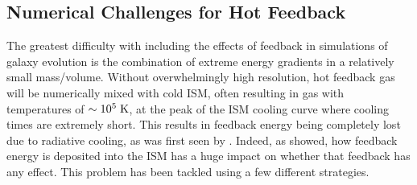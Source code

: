 \subsection{Numerical Challenges for Hot Feedback}
The greatest difficulty with including the effects of feedback in simulations of
galaxy evolution is the combination of extreme energy gradients in a relatively
small mass/volume.  Without overwhelmingly high resolution, hot feedback gas
will be numerically mixed with cold ISM, often resulting in gas with
temperatures of $\sim10^5\;\rm{K}$, at the peak of the ISM cooling curve where
cooling times are extremely short.  This results in feedback energy being
completely lost due to radiative cooling, as was first seen by \citet{Katz1992}.
Indeed, as \citet{Thacker2000} showed, how feedback energy is deposited into the
ISM has a huge impact on whether that feedback has any effect.  This problem has
been tackled using a few different strategies.  

